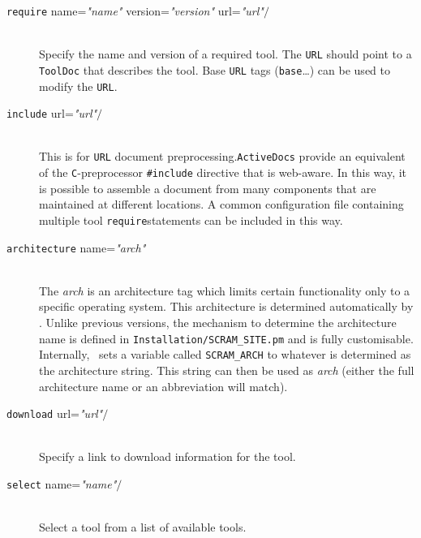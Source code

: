 \begin{description}     
\item[\lbkt\texttt{require} name=\textit{"name"} version=\textit{"version"} url=\textit{"url"}$/$\rbkt]\mbox{}\\
  Specify the name and version of a required tool. The \texttt{URL} should
  point to a \texttt{ToolDoc} that describes the tool. Base \texttt{URL} tags
  (\lbkt\texttt{base}\rbkt\ldots) can be used to modify the \texttt{URL}.
\item[\lbkt\texttt{include} url=\textit{"url"}$/$\rbkt]\mbox{}\\
  This is for \texttt{URL} document preprocessing.\texttt{ActiveDocs} provide
  an equivalent of the \texttt{C}-preprocessor
  \texttt{\#include}
  directive that is web-aware. In this way, it is possible to assemble
  a document from many components that are maintained at different
  locations.  A common configuration file containing multiple tool
  \lbkt\texttt{require}\rbkt statements can be included in this way.
\item[\lbkt\texttt{architecture} name=\textit{"arch"}\rbkt~]\mbox{}\\
  \ni The \textit{arch} is an architecture tag which limits certain
  functionality only to a specific operating system. This
  architecture is determined automatically by \scram. Unlike previous
  versions, the mechanism to determine the architecture name is
  defined in \texttt{Installation/SCRAM\_SITE.pm} and is fully
  customisable. Internally, \scram\ sets a variable called \texttt{SCRAM\_ARCH} to
  whatever is determined as the architecture string. This string can
  then be used as \textit{arch} (either the full architecture name or an
  abbreviation will match).

\item[\lbkt\texttt{download} url=\textit{"url"}$/$\rbkt]\mbox{}\\
  Specify a link to download information for the tool.
\item[\lbkt\texttt{select} name=\textit{"name"}$/$\rbkt]\mbox{}\\
  Select a tool from a list of available tools.
\end{description}

